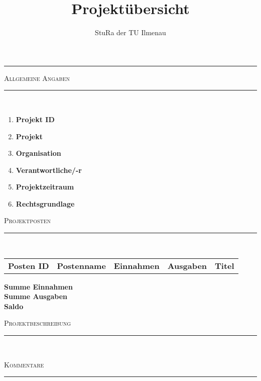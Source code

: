 \documentclass[a4paper,11pt]{article}
\makeatletter
\newcommand{\linia}{\rule{\linewidth}{0.5pt}}
\newcommand{\mysection}[1]{
	\begin{center}
	{\large \textsc{#1}}
	\vspace*{-0.5cm}
	\\\linia\\
	\vspace*{-0.5cm}
	\end{center}
}
\theoremstyle{mytheor}
\renewcommand{\maketitle}{
	\begin{center}
	\vspace*{-0.5cm}
	{\huge \textsc{\@title}}
	\linia
	\end{center}
}
\makeatother
\begin{document}
\title{Projektübersicht}
\author{StuRa der TU Ilmenau}

\vspace*{-2.0cm}
\begin{figure}[h]
\centering
\end{figure}

\maketitle

\vspace*{-0.5cm}

\mysection{Allgemeine Angaben}

\begin{enumerate}[label=\Roman*]
\itemsep-2mm
\item \textbf{Projekt ID}\hfill 
\item \textbf{Projekt}\hfill 
\item \textbf{Organisation} \hfill 
\item \textbf{Verantwortliche/-r} \hfill 
\item \textbf{Projektzeitraum} \hfill 
\item \textbf{Rechtsgrundlage} \hfill
\end{enumerate}

\vspace{1cm}

\mysection{Projektposten}

\begin{center}
\begin{tabular}{rrrrr}
\textbf{Posten ID} & \textbf{Postenname} & \textbf{Einnahmen} & \textbf{Ausgaben} & \textbf{Titel}\\ 
\end{tabular}
\end{center}
\vspace{0,5cm}
\textbf{Summe Einnahmen} \hfill \\
\textbf{Summe Ausgaben}\hfill \\
\textbf{Saldo} \hfill

\vspace{1cm}

\mysection{Projektbeschreibung}


\vspace{1cm}
\mysection{Kommentare}
\end{document}
